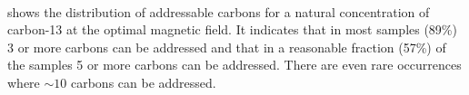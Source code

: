



\paragraph{ }
 shows the distribution of addressable carbons for a natural concentration of carbon-13 at the optimal magnetic field.
It indicates that in most samples (89\%) 3 or more carbons can be addressed and that in a reasonable fraction (57\%) of the samples 5 or more carbons can be addressed.
There are even rare occurrences where $\sim 10$ carbons can be addressed.




